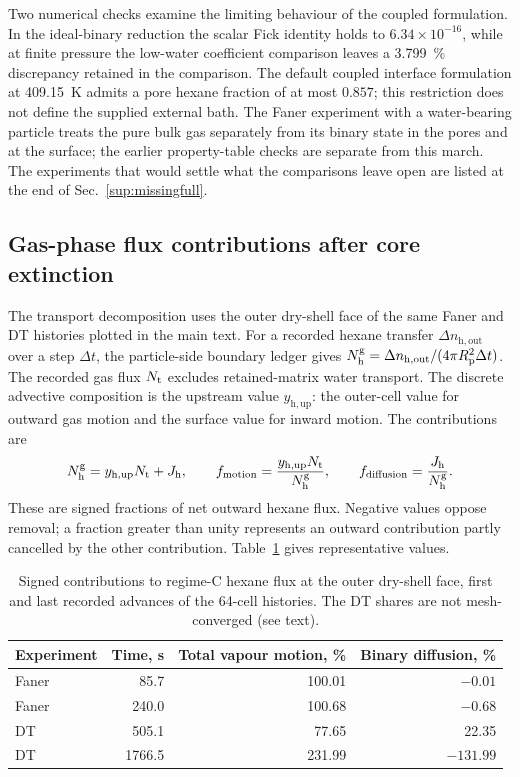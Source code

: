 Two numerical checks examine the limiting behaviour of the coupled formulation. In the ideal-binary reduction the scalar Fick identity holds to $6.34\times10^{-16}$, while at finite pressure the low-water coefficient comparison leaves a \SI{3.799}{\percent} discrepancy retained in the comparison. The default coupled interface formulation at \SI{409.15}{\kelvin} admits a pore hexane fraction of at most $0.857$; this restriction does not define the supplied external bath. The Faner experiment with a water-bearing particle treats the pure bulk gas separately from its binary state in the pores and at the surface; the earlier property-table checks are separate from this march. The experiments that would settle what the comparisons leave open are listed at the end of Sec.~\ref{sup:missingfull}.

\subsection{Gas-phase flux contributions after core extinction}
\label{sup:fluxcontributions}
The transport decomposition uses the outer dry-shell face of the same
Faner and DT histories plotted in the main text. For a recorded hexane
transfer $\Delta n_{\mathrm{h,out}}$ over a step $\Delta t$, the particle-side
boundary ledger gives $N_{\mathrm h}^{\mathrm g}
=\Delta n_{\mathrm{h,out}}/(4\pi R_{\mathrm{p}}^2\Delta t)$. The recorded gas flux
$N_{\mathrm{t}}$ excludes retained-matrix water transport. The discrete advective
composition is the upstream value $y_{\mathrm{h,up}}$: the outer-cell
value for outward gas motion and the surface value for inward motion.
The contributions are
\[
N_{\mathrm h}^{\mathrm g}=y_{\mathrm{h,up}}N_{\mathrm{t}}+J_{\mathrm h},
\qquad
f_{\mathrm{motion}}=\frac{y_{\mathrm{h,up}}N_{\mathrm{t}}}{N_{\mathrm h}^{\mathrm g}},
\qquad
f_{\mathrm{diffusion}}=\frac{J_{\mathrm h}}{N_{\mathrm h}^{\mathrm g}}.
\]
These are signed fractions of net outward hexane flux. Negative values
oppose removal; a fraction greater than unity represents an outward
contribution partly cancelled by the other contribution.
Table~\ref{tab:sub:fluxcontributions} gives representative values.

\begin{table}[htbp]\centering\small
\caption{Signed contributions to regime-C hexane flux at the outer dry-shell
face, first and last recorded advances of the 64-cell histories. The DT
shares are not mesh-converged (see text).}
\label{tab:sub:fluxcontributions}
\begin{tabular}{@{}lrrr@{}}\toprule
Experiment & Time, s & Total vapour motion, \% & Binary diffusion, \%\\\midrule
Faner & 85.7 & 100.01 & $-0.01$\\
Faner & 240.0 & 100.68 & $-0.68$\\
DT & 505.1 & 77.65 & 22.35\\
DT & 1766.5 & 231.99 & $-131.99$\\
\bottomrule\end{tabular}\end{table}

